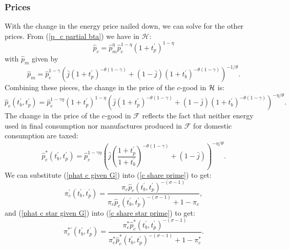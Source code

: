 \documentclass[notitlepage,12pt]{article}
\begin{document}
\subsubsection{Prices}

With the change in the energy price nailed down, we can solve for the other
prices. From (\ref{p_c partial bta}) we have in $\mathcal{H}$:%
\begin{equation*}
\hat{p}_{c}=\hat{p}_{m}^{\eta }\hat{p}_{e}^{1-\eta }(1+t_{p}^{\prime
})^{1-\eta }
\end{equation*}%
with $\hat{p}_{m}$ given by%
\begin{equation*}
\hat{p}_{m}=\hat{p}_{e}^{1-\gamma }\left( \bar{j}\left( 1+t_{p}^{\prime
}\right) ^{-\theta \left( 1-\gamma \right) }+\left( 1-\bar{j}\right) \left(
1+t_{b}^{\prime }\right) ^{-\theta \left( 1-\gamma \right) }\right)
^{-1/\theta }.
\end{equation*}%
Combining these pieces, the change in the price of the $c$-good in $\mathcal{%
H}$ is:%
\begin{equation}
\hat{p}_{c}(t_{b}^{\prime },t_{p}^{\prime })=\hat{p}_{e}^{1-\gamma \eta
}(1+t_{p}^{\prime })^{1-\eta }\left( \bar{j}\left( 1+t_{p}^{\prime }\right)
^{-\theta \left( 1-\gamma \right) }+\left( 1-\bar{j}\right) \left(
1+t_{b}^{\prime }\right) ^{-\theta \left( 1-\gamma \right) }\right) ^{-\eta
/\theta }.  \label{phat c given G}
\end{equation}%
The change in the price of the $c$-good in $\mathcal{F}$ reflects the fact
that neither energy used in final consumption nor manufactures produced in $%
\mathcal{F}$ for domestic consumption are taxed:%
\begin{equation}
\hat{p}_{c}^{\ast }(t_{b}^{\prime },t_{p}^{\prime })=\hat{p}_{e}^{1-\gamma
\eta }\left( \bar{j}\left( \frac{1+t_{p}^{\prime }}{1+t_{b}^{\prime }}%
\right) ^{-\theta \left( 1-\gamma \right) }+\left( 1-\bar{j}\right) \right)
^{-\eta /\theta }.  \label{phat c star given G}
\end{equation}%
We can substitute (\ref{phat c given G}) into (\ref{c share prime}) to get:%
\begin{equation}
\pi _{c}^{\prime }(t_{b}^{\prime },t_{p}^{\prime })=\frac{\pi _{c}\hat{p}%
_{c}(t_{b}^{\prime },t_{p}^{\prime })^{-\left( \sigma -1\right) }}{\pi _{c}%
\hat{p}_{c}(t_{b}^{\prime },t_{p}^{\prime })^{-\left( \sigma -1\right)
}+1-\pi _{c}},  \label{c share prime function}
\end{equation}%
and (\ref{phat c star given G}) into (\ref{c share star prime}) to get: 
\begin{equation}
\pi _{c}^{\ast \prime }(t_{b}^{\prime },t_{p}^{\prime })=\frac{\pi
_{c}^{\ast }\hat{p}_{c}^{\ast }(t_{b}^{\prime },t_{p}^{\prime })^{-\left(
\sigma -1\right) }}{\pi _{c}^{\ast }\hat{p}_{c}^{\ast }(t_{b}^{\prime
},t_{p}^{\prime })^{-\left( \sigma -1\right) }+1-\pi _{c}^{\ast }}.
\label{c share star prime function}
\end{equation}
\end{document}
